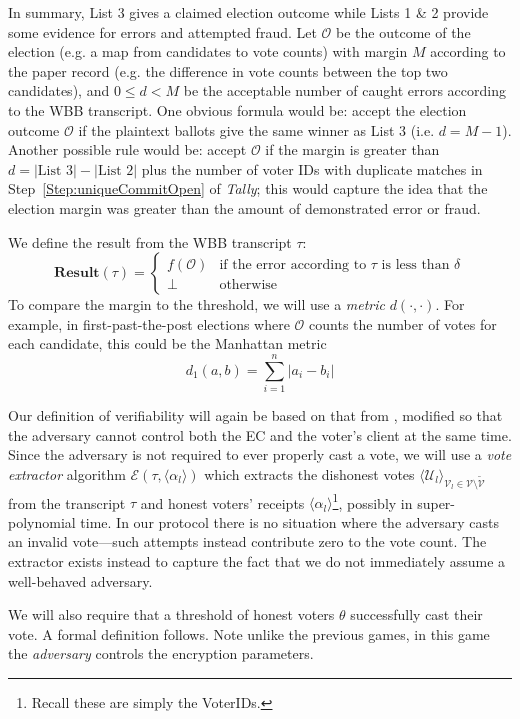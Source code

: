 \documentclass[12pt,a4paper]{article}
\theoremstyle{definition}
\newcounter{protocol}
\begin{document}
In summary, List 3 gives a claimed election outcome while Lists 1 \& 2 provide some evidence for errors and attempted fraud. Let $\mathcal{O}$ be the outcome of the election (e.g. a map from candidates to vote counts) with margin $M$ according to the paper record (e.g. the difference in vote counts between the top two candidates), and $0 \leq d < M$ be the acceptable number of caught errors according to the WBB transcript. One obvious formula would be: accept the election outcome $\mathcal{O}$ if the plaintext ballots give the same winner as List 3 (i.e. $d = M - 1$).  Another possible rule would be: accept $\mathcal{O}$ if the margin is greater than
$d = |\text{List 3}| - |\text{List 2}|$ 
plus the number of voter IDs with duplicate matches in Step~\ref{Step:uniqueCommitOpen} of \textit{Tally}; this would capture the idea that the election margin was greater than the amount of demonstrated error or fraud.

We define the result from the WBB transcript $\tau$:
$$\mathbf{Result}(\tau)=
\begin{cases}
    f(\mathcal{O})  &   \text{if the error according to }\tau\text{ is less than }\delta\\
    \bot            &   \text{otherwise}
\end{cases}$$
To compare the margin to the threshold, we will use a \textit{metric} $d(\cdot,\cdot)$. For example, in first-past-the-post elections where $\mathcal{O}$ counts the number of votes for each candidate, this could be the Manhattan metric
$$d_1(a, b)=\sum_{i=1}^n |a_i-b_i|$$

Our definition of verifiability will again be based on that from \cite{kiayias2015end}, modified so that the adversary cannot control both the EC and the voter's client at the same time. Since the adversary is not required to ever properly cast a vote, we will use a \textit{vote extractor} algorithm $\mathcal{E}\left(\tau, \langle \alpha_l \rangle\right)$ which extracts the dishonest votes $\langle \mathcal{U}_l \rangle_{\mathcal{V}_l\in\mathcal{V}\setminus\tilde{\mathcal{V}}}$ from the transcript $\tau$ and honest voters' receipts $\langle \alpha_l \rangle$\footnote{Recall these are simply the VoterIDs.}, possibly in super-polynomial time. In our protocol there is no situation where the adversary casts an invalid vote---such attempts instead contribute zero to the vote count. The extractor exists instead to capture the fact that we do not immediately assume a well-behaved adversary.

We will also require that a threshold of honest voters $\theta$ successfully cast their vote. A formal definition follows. Note unlike the previous games, in this game the \textit{adversary} controls the encryption parameters.
\end{document}
